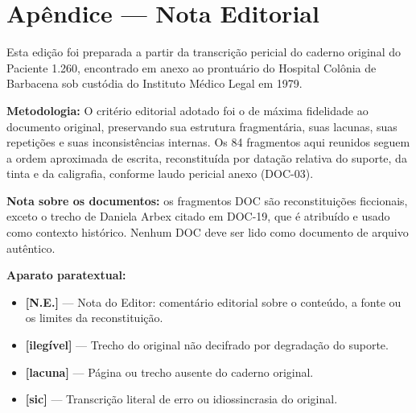 \cleardoublepage
\thispagestyle{empty}
\chapter*{Apêndice --- Nota Editorial}

\begingroup

Esta edição foi preparada a partir da transcrição pericial do caderno original do Paciente 1.260, encontrado em anexo ao prontuário do Hospital Colônia de Barbacena sob custódia do Instituto Médico Legal em 1979.

\vspace{0.6em}

\noindent\textbf{Metodologia:}
O critério editorial adotado foi o de máxima fidelidade ao documento original, preservando sua estrutura fragmentária, suas lacunas, suas repetições e suas inconsistências internas. Os 84 fragmentos aqui reunidos seguem a ordem aproximada de escrita, reconstituída por datação relativa do suporte, da tinta e da caligrafia, conforme laudo pericial anexo (DOC-03).

\noindent\textbf{Nota sobre os documentos:} os fragmentos DOC são reconstituições ficcionais, exceto o trecho de Daniela Arbex citado em DOC-19, que é atribuído e usado como contexto histórico. Nenhum DOC deve ser lido como documento de arquivo autêntico.

\vspace{0.6em}

\noindent\textbf{Aparato paratextual:}
\begin{itemize}
  \item \textbf{[N.E.]} --- Nota do Editor: comentário editorial sobre o conteúdo, a fonte ou os limites da reconstituição.
  \item \textbf{[ilegível]} --- Trecho do original não decifrado por degradação do suporte.
  \item \textbf{[lacuna]} --- Página ou trecho ausente do caderno original.
  \item \textbf{[sic]} --- Transcrição literal de erro ou idiossincrasia do original.
\end{itemize}

\vspace{0.6em}

